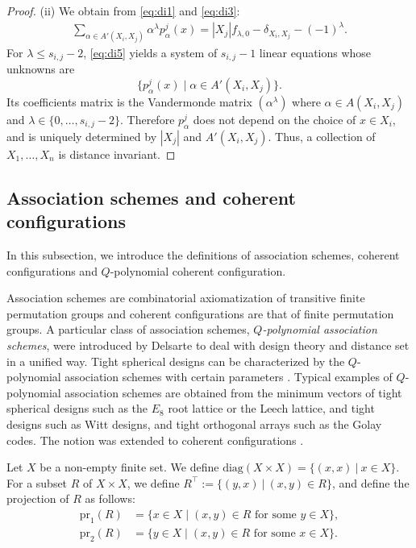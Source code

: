 \documentclass[11pt]{article}
\theoremstyle{definition}
\theoremstyle{remark}
\begin{document}
\begin{proof}
    (ii) We obtain from \eqref{eq:di1} and \eqref{eq:di3}:   
    \begin{align}\label{eq:di5}
        \sum_{\alpha\in A'(X_i,X_j)}\alpha^\lambda p_{\alpha}^j(x)=|X_j|f_{\lambda,0}-\delta_{X_i,X_j}-(-1)^\lambda.
    \end{align}
    For $\lambda\leq s_{i,j}-2$, \eqref{eq:di5} yields a system of $s_{i,j}-1$ linear equations whose unknowns are
    \[
    \{p_{\alpha}^j(x) \mid \alpha\in A'(X_i,X_j)\}. 
    \]
    Its coefficients matrix is 
 the Vandermonde matrix $(\alpha^\lambda)$ where $\alpha\in A(X_i,X_j)$ and $\lambda\in\{0,\ldots,s_{i,j}-2\}$. 
 Therefore $p_{\alpha}^j$ does not depend on the choice of $x\in X_i$, and is uniquely determined by $|X_j|$ and $A'(X_i,X_j)$.
 Thus, a collection of $X_1,\ldots,X_n$ is distance invariant. 
\end{proof}

\subsection{Association schemes and coherent configurations}\label{sec:qcc}


In this subsection, we introduce the definitions of association schemes, coherent configurations and $Q$-polynomial coherent configuration.

Association schemes are combinatorial axiomatization of transitive finite permutation groups and coherent configurations are that of finite permutation groups.   
A particular class of association schemes, {\it $Q$-polynomial association schemes}, were introduced by Delsarte \cite{D73} to deal with design theory and distance set in a unified way. 
Tight spherical designs can be characterized by the $Q$-polynomial association schemes with certain parameters \cite{DGS77}.
Typical examples of $Q$-polynomial association schemes are obtained from the minimum vectors of tight spherical designs such as the $E_8$ root lattice or the Leech lattice, and tight designs such as Witt designs, and tight orthogonal arrays such as the Golay codes.  
The notion was extended to coherent configurations \cite{Suda22}. 

 

Let $X$ be a non-empty finite set.  We define $\mathrm{diag}(X \times X) = \{(x, x)\ |\ x \in  X\}$. 
For a subset $R$ of $X\times X$, we define $R^\top:=\{(y,x)\ |\ (x,y)\in R\}$, and define the projection of $R$ as follows:
\begin{align*}
\mathrm{pr}_1(R)&=\{x\in X\mid (x,y)\in R \text{ for some }y\in X\},\\
\mathrm{pr}_2(R)&=\{y\in X\mid (x,y)\in R \text{ for some }x\in X\}.
\end{align*}
\end{document}
